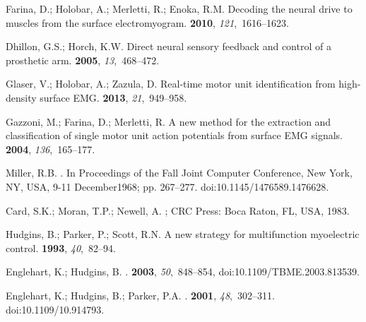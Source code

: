 \documentclass[sensors,review,accept,moreauthors,pdftex]{Definitions/mdpi}
\begin{document}
\begin{thebibliography}{999}
Farina, D.; Holobar, A.; Merletti, R.; Enoka, R.M.
\newblock Decoding the neural drive to muscles from the surface electromyogram.
 {\bf 2010}, {\em 121},~1616--1623.

Dhillon, G.S.; Horch, K.W.
\newblock Direct neural sensory feedback and control of a prosthetic arm.
 {\bf 2005}, {\em 13},~468--472.

Glaser, V.; Holobar, A.; Zazula, D.
\newblock Real-time motor unit identification from high-density surface EMG.
 {\bf 2013}, {\em 21},~949--958.

Gazzoni, M.; Farina, D.; Merletti, R.
\newblock A new method for the extraction and classification of single motor
  unit action potentials from surface EMG signals.
 {\bf 2004}, {\em
  136},~165--177.

Miller, R.B.
. In {Proceedings of the  Fall Joint Computer Conference}, New York, NY, USA, 9-11 December1968;
\newblock pp. 267--277. doi:10.1145/1476589.1476628.

Card, S.K.; Moran, T.P.; Newell, A.
; CRC Press:  Boca Raton, FL, USA, { 1983}.

Hudgins, B.; Parker, P.; Scott, R.N.
\newblock A new strategy for multifunction myoelectric control.
 {\bf 1993}, {\em
  40},~82--94.

Englehart, K.; Hudgins, B.
.
 {\bf 2003}, {\em
  50},~848--854, doi:10.1109/TBME.2003.813539.

Englehart, K.; Hudgins, B.; Parker, P.A.
.
 {\bf 2001}, {\em
  48},~302--311. doi:10.1109/10.914793.


\end{thebibliography}
\end{document}
